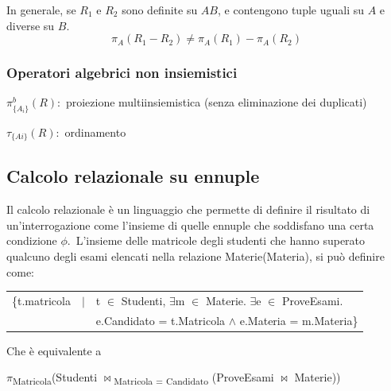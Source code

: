In generale, se $R_1$ e $R_2$ sono definite su $AB$, e contengono tuple uguali su $A$ e diverse su $B$.
\[\pi_A(R_1-R_2) \neq \pi_A(R_1)-\pi_A(R_2)\]


\subsubsection{Operatori algebrici non insiemistici}

$\pi^b_{\{A_i\}}(R)$:\ proiezione multiinsiemistica (senza eliminazione dei duplicati)

\noindent$\tau_{\{Ai\}}(R)$:\ ordinamento

\subsection{Calcolo relazionale su ennuple}

Il calcolo relazionale è un linguaggio che permette di definire il risultato di un'interrogazione come l'insieme di quelle ennuple che soddisfano una certa condizione $\phi$.\
L'insieme delle matricole degli studenti che hanno superato qualcuno degli esami elencati nella relazione Materie(Materia), si può definire come:\
\begin{table}[H]
	\centering
	\begin{tabular}{l c l}
		\{t.matricola & $|$ & t $\in$ Studenti, $\exists$m $\in$ Materie. $\exists$e $\in$ ProveEsami. \\
		              &     & e.Candidato = t.Matricola $\land$ e.Materia = m.Materia\}                \\
	\end{tabular}
\end{table}

\noindent Che è equivalente a

\begin{center}
	$\pi$\textsubscript{Matricola}(Studenti $\Join$\textsubscript{Matricola = Candidato} (ProveEsami $\Join$ Materie))
\end{center}
